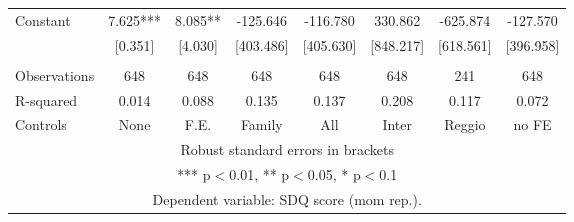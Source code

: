 \begin{tabular}{lccccccc}
Constant & 7.625*** & 8.085** & -125.646 & -116.780 & 330.862 & -625.874 & -127.570 \\
 & [0.351] & [4.030] & [403.486] & [405.630] & [848.217] & [618.561] & [396.958] \\
 &  &  &  &  &  &  &  \\
Observations & 648 & 648 & 648 & 648 & 648 & 241 & 648 \\
R-squared & 0.014 & 0.088 & 0.135 & 0.137 & 0.208 & 0.117 & 0.072 \\
 Controls & None & F.E. & Family & All & Inter & Reggio & no FE \\ \hline
\multicolumn{8}{c}{ Robust standard errors in brackets} \\
\multicolumn{8}{c}{ *** p$<$0.01, ** p$<$0.05, * p$<$0.1} \\
\multicolumn{8}{c}{ Dependent variable: SDQ score (mom rep.).} \\
\end{tabular}
